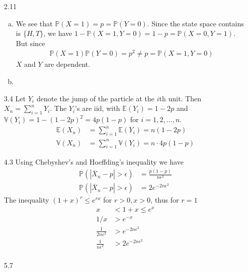 \documentclass[a4paper,10pt]{article}
\theoremstyle{definition}
\begin{document}
\begin{enumerate}
\begin{enumerate}[(a)]
\end{enumerate}
\item[2.11]
\begin{enumerate}[(a)]
\item We see that $\mathbb{P}(X = 1) = p = \mathbb{P}(Y=0)$. Since the state space contains is $\{H,T\}$, we have $1 - \mathbb{P}(X =1,Y=0) = 1- p = \mathbb{P}(X = 0, Y = 1)$. But since
\begin{align*}
\mathbb{P}(X = 1)\mathbb{P}(Y=0) = p^2 \neq p = \mathbb{P}(X = 1, Y =0)
\end{align*}
$X$ and $Y$ are dependent.
\item
\end{enumerate}

\item[3.4] Let $Y_i$ denote the jump of the particle at the $i$th unit. Then $X_n=\sum_{i=1}^nY_i$. The $Y_i$'s are iid, with $\mathbb{E}(Y_i)=1-2p$ and $\mathbb{V}(Y_i) = 1 - (1-2p)^2 = 4p(1-p)$ for $i=1,2,\ldots, n$.
\begin{align*}
\mathbb{E}(X_n) &= \sum_{i=1}^n\mathbb{E}(Y_i) = n(1-2p)\\
\mathbb{V}(X_n) &= \sum_{i=1}^n\mathbb{V}(Y_i) = n\cdot4p(1-p)
\end{align*}
\item[4.3] Using Chebyshev's and Hoeffding's inequality we have
\begin{align*}
\mathbb{P}(|\overline{X}_n - p|>\epsilon) &= \frac{p(1-p)}{n \epsilon^2} \\
\mathbb{P}(|\overline{X}_n - p|>\epsilon) &= 2e^{-2n\epsilon^2}
\end{align*}
The inequality $(1+x)^r \leq e^{rx}$ for $r>0, x>0$, thus for $r=1$
\begin{align*}
x &< 1 + x \leq e^x\\
1/x &> e^{-x}\\
\frac{1}{2n\epsilon^2} &> e^{-2n\epsilon^2}\\
\frac{1}{n\epsilon^2} &> 2e^{-2n\epsilon^2}\\
\end{align*}
\item[5.7]
\end{enumerate}
\end{document}
